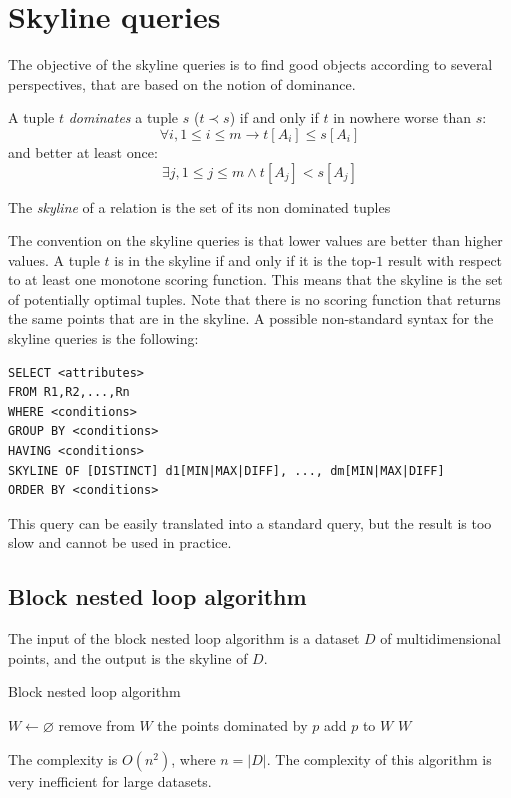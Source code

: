 \documentclass[12pt, a4paper]{report}
\begin{document}
    \section{Skyline queries}
    The objective of the skyline queries is to find good objects according to several perspectives, that are based on the notion of dominance. 
    \begin{definition}
        A tuple $t$ \emph{dominates} a tuple $s$ ($t \prec s$) if and only if $t$ in nowhere worse than $s$: 
        \[\forall i, 1 \leq i \leq m \rightarrow t[A_i] \leq s[A_i]\] 
        and better at least once: 
        \[\exists j, 1 \leq j \leq m \land t[A_j] < s[A_j]\]


        The \emph{skyline} of a relation is the set of its non dominated tuples
    \end{definition}
    The convention on the skyline queries is that lower values are better than higher values. A tuple $t$ is in the skyline if
    and only if  it is the top-$1$ result with respect to at least one monotone scoring function. This means that the skyline is the set of potentially optimal tuples. 
    Note that there is no scoring function that returns the same points that are in the skyline. A possible non-standard syntax for the 
    skyline queries is the following: 
    \begin{lstlisting}[style=SQL]
SELECT <attributes>
FROM R1,R2,...,Rn
WHERE <conditions>
GROUP BY <conditions>
HAVING <conditions>
SKYLINE OF [DISTINCT] d1[MIN|MAX|DIFF], ..., dm[MIN|MAX|DIFF]
ORDER BY <conditions>
    \end{lstlisting}
    This query can be easily translated into a standard query, but the result is too slow and cannot be used in practice. 

    \subsection{Block nested loop algorithm}
    The input of the block nested loop algorithm is a dataset $D$ of multidimensional points, and the output is the skyline of $D$.
    \begin{algorithm}[H]
        \caption{Block nested loop algorithm}
            \begin{algorithmic}[1]
                \State $W \leftarrow \varnothing$
                        \State remove from $W$ the points dominated by $p$
                        \State add $p$ to $W$
                    \EndIf
                \EndFor
                \State \Return $W$
            \end{algorithmic}
    \end{algorithm}
    The complexity is $O(n^2)$, where $n=\left\lvert D \right\rvert $. The complexity of this algorithm is very inefficient for large datasets. 
\end{document}

